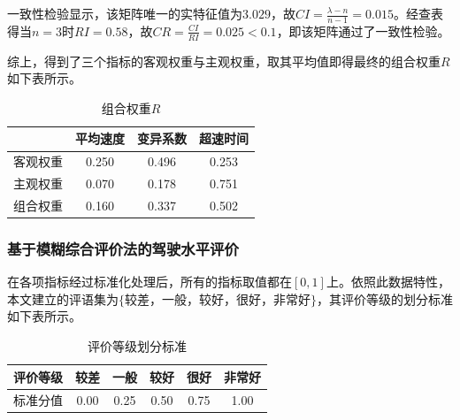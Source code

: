 \documentclass[bwprint]{cumcmthesis}
\begin{document}
            一致性检验显示，该矩阵唯一的实特征值为$3.029$，故$CI=\frac{\lambda-n}{n-1}=0.015$。经查表得当$n=3$时$RI=0.58$，故$CR=\frac{CI}{RI}=0.025<0.1$，即该矩阵通过了一致性检验。

            综上，得到了三个指标的客观权重与主观权重，取其平均值即得最终的组合权重$R$如下表所示。
            \begin{table}[htbp]
                \centering
                \caption{组合权重$R$}
                    \begin{tabular}{|c|c|c|c|}
                    \hline
                    & 平均速度 & 变异系数 & 超速时间 \\
                    \hline
                    客观权重  & 0.250 & 0.496 & 0.253 \\
                    \hline
                    主观权重  & 0.070 & 0.178 & 0.751 \\
                    \hline
                    组合权重  & 0.160 & 0.337 & 0.502 \\
                    \hline
                    \end{tabular}
                \label{tab:eight}
              \end{table}
            \subsubsection{基于模糊综合评价法的驾驶水平评价}
            在各项指标经过标准化处理后，所有的指标取值都在$[0,1]$上。依照此数据特性，本文建立的评语集为$\{\text{较差，一般，较好，很好，非常好}\}$，其评价等级的划分标准如下表所示。
            \begin{table}[htbp]
                \centering
                \caption{评价等级划分标准}
                    \begin{tabular}{|c|c|c|c|c|c|}
                    \hline
                    评价等级  & 较差    & 一般    & 较好    & 很好    & 非常好 \\
                    \hline
                    标准分值  & 0.00     & 0.25  & 0.50   & 0.75  & 1.00 \\
                    \hline
                    \end{tabular}
                \label{tab:nine}
            \end{table}
            
\end{document}
